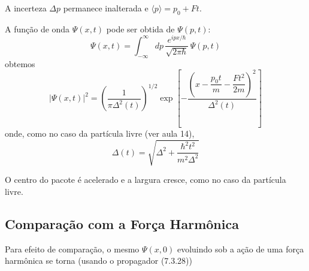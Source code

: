 A incerteza $\Delta p$ permanece inalterada e $\langle p \rangle = p_0 + Ft$.

A função de onda $\Psi(x,t)$ pode ser obtida de $\Psi(p,t)$:
\begin{equation}
    \Psi(x,t) = \int_{-\infty}^{\infty} dp\, \frac{e^{ipx/\hbar}}{\sqrt{2\pi\hbar}}\, \Psi(p,t)
\label{eq:aula17_psi_xt_integral}
\end{equation}
obtemos
\begin{equation}
    \boxed{ |\Psi(x,t)|^2 = \left( \frac{1}{\pi\Delta^2(t)} \right)^{1/2} \exp\left[ -\frac{\left( x - \dfrac{p_0 t}{m} - \dfrac{Ft^2}{2m} \right)^2}{\Delta^2(t)} \right] }
\label{eq:aula17_modulo_psi_xt}
\end{equation}
onde, como no caso da partícula livre (ver aula 14),
\begin{equation}
    \boxed{ \Delta(t) = \sqrt{ \Delta^2 + \frac{\hbar^2 t^2}{m^2 \Delta^2} } }
\label{eq:aula17_Delta_t}
\end{equation}

O centro do pacote é acelerado e a largura cresce, como no caso da partícula livre.

\begin{center}
\end{center}



\subsection*{Comparação com a Força Harmônica}

Para efeito de comparação, o mesmo $\Psi(x,0)$ evoluindo sob a ação de uma força harmônica se torna (usando o propagador (7.3.28))

